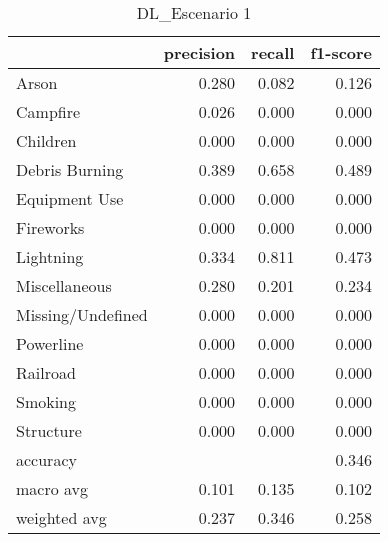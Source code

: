 \begin{table}
\centering
\caption{DL_Escenario 1}
\label{tab:Reporte de clasificación para el Escenario 1 utilizando Discriminante Lineal}
\begin{tabular}{lrrr}
\toprule
{} &  precision &  recall &  f1-score \\
\midrule
Arson             &      0.280 &   0.082 &     0.126 \\
Campfire          &      0.026 &   0.000 &     0.000 \\
Children          &      0.000 &   0.000 &     0.000 \\
Debris Burning    &      0.389 &   0.658 &     0.489 \\
Equipment Use     &      0.000 &   0.000 &     0.000 \\
Fireworks         &      0.000 &   0.000 &     0.000 \\
Lightning         &      0.334 &   0.811 &     0.473 \\
Miscellaneous     &      0.280 &   0.201 &     0.234 \\
Missing/Undefined &      0.000 &   0.000 &     0.000 \\
Powerline         &      0.000 &   0.000 &     0.000 \\
Railroad          &      0.000 &   0.000 &     0.000 \\
Smoking           &      0.000 &   0.000 &     0.000 \\
Structure         &      0.000 &   0.000 &     0.000 \\
accuracy          &            &         &     0.346 \\
macro avg         &      0.101 &   0.135 &     0.102 \\
weighted avg      &      0.237 &   0.346 &     0.258 \\
\bottomrule
\end{tabular}
\end{table}
